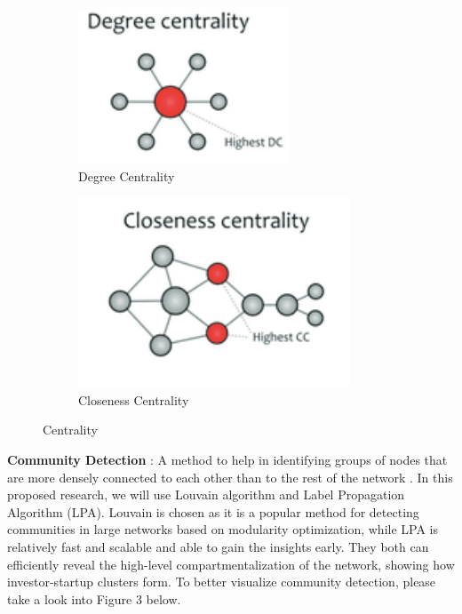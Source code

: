 \documentclass[a4paper,11pt]{article}
\begin{document}
\begin{figure}[ht]
\centering
\begin{subfigure}[b]{0.35\textwidth}
    \includegraphics[width=\textwidth]{Degree.png}
    \caption{Degree Centrality}
    \label{fig:image1}
\end{subfigure}
\hfill
\begin{subfigure}[b]{0.35\textwidth}
    \includegraphics[width=\textwidth]{Closeness.png}
    \caption{Closeness Centrality}
    \label{fig:image2}
\end{subfigure}
\caption{Centrality}
\label{fig:doubleimage}
\end{figure}

\textbf{Community Detection} : A method to help in identifying groups of nodes that are more densely connected to each other than to the rest of the network \cite{albert2019a}. In this proposed research, we will use Louvain algorithm and Label Propagation Algorithm (LPA). Louvain is chosen as it is a popular method for detecting communities in large networks based on modularity optimization, while LPA is relatively fast and scalable and able to gain the insights early. They both can efficiently reveal the high-level compartmentalization of the network, showing how investor-startup clusters form. To better visualize community detection, please take a look into Figure 3 below.
\end{document}
